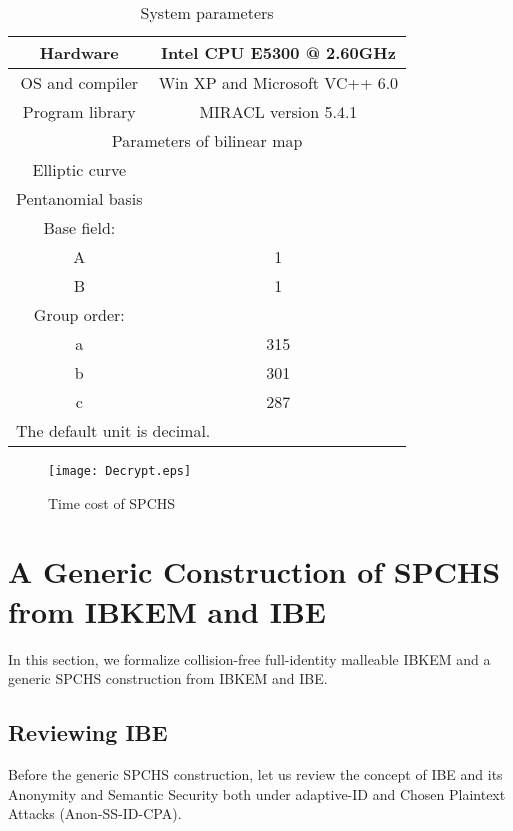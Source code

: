 \documentclass[10pt,twocolumn,twoside]{IEEEtran}
\begin{document}
{\begin{table}
\centering
\caption{System parameters}\label{T.Parameters}
\begin{tabular}{|c|c|c|}
\hline
Hardware & \multicolumn{2}{c|}{Intel CPU
	E5300 @ 2.60GHz}
\\ \hline OS and compiler & \multicolumn{2}{c|}{Win XP and
Microsoft VC++ 6.0}
\\ \hline Program library & \multicolumn{2}{c|}{MIRACL version 5.4.1}
\\ \hline \multicolumn{3}{|c|}{Parameters of bilinear map}
\\ \hline Elliptic curve & \multicolumn{2}{c|}{}
\\ \hline Pentanomial basis & \multicolumn{2}{c|}{}
\\ \hline Base field:  & \multicolumn{2}{c|}{}
\\ \hline A & \multicolumn{2}{c|}{1}
\\ \hline B & \multicolumn{2}{c|}{1}
\\ \hline Group order:  & \multicolumn{2}{c|}{}
\\ \hline a & \multicolumn{2}{c|}{315}
\\ \hline b & \multicolumn{2}{c|}{301}
\\ \hline c & \multicolumn{2}{c|}{287}
\\ \hline \multicolumn{3}{|l|}{The default unit is decimal.}
\\ \hline
\end{tabular}
\end{table}

\begin{figure}
\centering
\texttt{[image: Decrypt.eps]}
\caption{Time cost of SPCHS}\label{F.Result}
\end{figure}

\section{A Generic Construction of SPCHS \\ from IBKEM and IBE}\label{S.SPCHS.Generic}

In this section, we formalize collision-free full-identity malleable IBKEM and a generic SPCHS construction from IBKEM and IBE. 

\subsection{Reviewing IBE}
Before the generic SPCHS construction, let us review the concept of IBE and its Anonymity and Semantic Security both under adaptive-ID and Chosen Plaintext Attacks (Anon-SS-ID-CPA).

}
\end{document}

